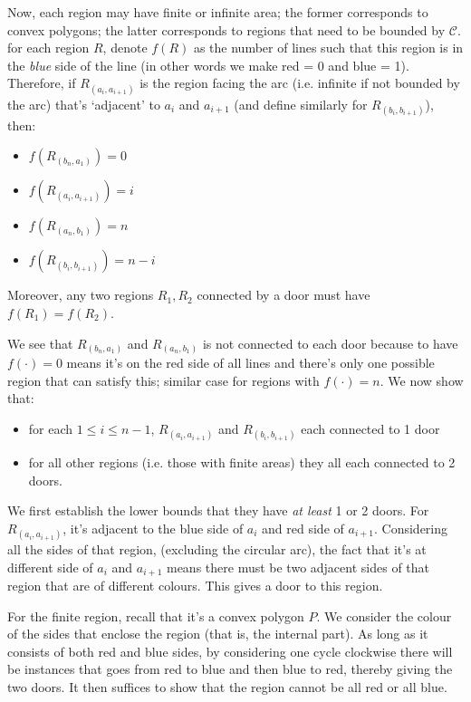 \documentclass[11pt,a4paper]{article}
\begin{document}
\begin{enumerate}
	Now, each region may have finite or infinite area; the former corresponds to convex polygons; the latter corresponds to regions that need to be bounded by $\mathcal{C}$. for each region $R$, denote $f(R)$ as the number of lines such that this region is in the \emph{blue} side of the line (in other words we make red = 0 and blue = 1). Therefore, if $R_{(a_i, a_{i+1})}$ is the region facing the arc (i.e. infinite if not bounded by the arc) that's `adjacent' to $a_i$ and $a_{i+1}$ (and define similarly for $R_{(b_i, b_{i+1})}$), then: 
	\begin{itemize}
		\item $f(R_{(b_n, a_1)})=0$
		\item $f(R_{(a_i, a_{i+1})})=i$
		\item $f(R_{(a_n, b_1)})=n$
		\item $f(R_{(b_i, b_{i+1})})=n-i$
	\end{itemize}
	Moreover, any two regions $R_1, R_2$ connected by a door must have $f(R_1)=f(R_2)$. 
	
	We see that $R_{(b_n, a_1)}$ and $R_{(a_n, b_1)}$ is not connected to each door because to have $f(\cdot)=0$ means it's on the red side of all lines and there's only one possible region that can satisfy this; similar case for regions with $f(\cdot)=n$. We now show that: 
	\begin{itemize}
		\item for each $1\le i\le n-1$, $R_{(a_i, a_{i+1})}$ and $R_{(b_i, b_{i+1})}$ each connected to 1 door 
		\item for all other regions (i.e. those with finite areas) they all each connected to 2 doors. 
	\end{itemize}
	
	We first establish the lower bounds that they have \emph{at least} 1 or 2 doors. For $R_{(a_i, a_{i+1})}$, it's adjacent to the blue side of $a_i$ and red side of $a_{i+1}$. Considering all the sides of that region, (excluding the circular arc), the fact that it's at different side of $a_i$ and $a_{i+1}$ means there must be two adjacent sides of that region that are of different colours. This gives a door to this region. 
	
	For the finite region, recall that it's a convex polygon $P$. We consider the colour of the sides that enclose the region (that is, the internal part). As long as it consists of both red and blue sides, by considering one cycle clockwise there will be instances that goes from red to blue and then blue to red, thereby giving the two doors. It then suffices to show that the region cannot be all red or all blue. 
	

\end{enumerate}
\end{document}

